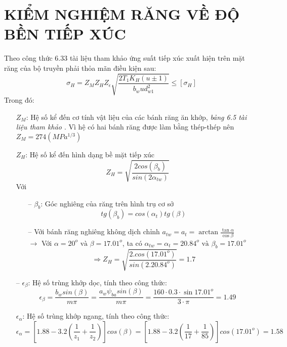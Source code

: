         \section{KIỂM NGHIỆM RĂNG VỀ ĐỘ BỀN TIẾP XÚC}
            \hspace*{0.6cm}Theo công thức 6.33 tài liệu tham khảo \cite{tltk1} ứng suất tiếp xúc xuất hiện trên mặt răng của bộ truyền phải thỏa mãn điều kiện sau:
            \begin{equation}
                \sigma_H = Z_MZ_HZ_\epsilon\sqrt{\frac{2T_1K_H(u \pm 1)}{b_wud^2_{w1}}} \leq [\sigma_H]
                \label{eq:3.14}
            \end{equation}
            \hspace*{0.6cm}Trong đó:
            \begin{itemize}
                \item[] $Z_M$: Hệ số kể đến cơ tính vật liệu của các bánh răng ăn khớp, \textit{bảng 6.5 tài liệu tham khảo \cite{tltk1}}. Vì hệ có hai bánh răng được làm bằng thép-thép nên $Z_M = 274 (MPa^{1/3})$  
                \item[] $Z_H$: Hệ số kể đến hình dạng bề mặt tiếp xúc
                    $$Z_H = \sqrt{\frac{2cos(\beta_b)}{sin(2\alpha_{tw})}}$$
                    Với 
                    \begin{itemize}
                        \item [--] $\beta_b$: Góc nghiêng của răng trên hình trụ cơ sở
                        $$tg(\beta_b) = cos(\alpha_t)tg(\beta)$$
                        \item [--] Với bánh răng nghiêng không dịch chỉnh $a_{tw} = a_t = \arctan{\frac{\tan{\alpha}}{\cos{\beta}}}$ \\
                        $\rightarrow$ Với $\alpha = 20^o \text{ và } \beta = 17.01^o$, ta có $\alpha_{tw} = \alpha_t = 20.84^o \text{ và } \beta_b = 17.01^o$\\
                        $$\Rightarrow Z_H = \sqrt{\frac{2.cos(17.01^o)}{sin(2.20.84^o)}} = 1.7$$ 
                    \end{itemize}
                \item[--] $\epsilon_\beta$: Hệ số trùng khớp dọc, tính theo công thức:
                    $$\epsilon_\beta = \frac{b_wsin(\beta)}{m\pi} = \frac{a_w\psi_{ba}sin(\beta)}{m\pi} = \frac{160 \cdot 0.3 \cdot \sin{17.01^o}}{3 \cdot \pi} = 1.49$$
                \item[] $\epsilon_\alpha$: Hệ số trùng khớp ngang, tính theo công thức:
                    $$\epsilon_\alpha = [1.88 - 3.2(\frac{1}{z_1} + \frac{1}{z_2})]cos(\beta) = [1.88 - 3.2(\frac{1}{17} + \frac{1}{85})]cos(17.01^o) = 1.58$$

\end{itemize}
